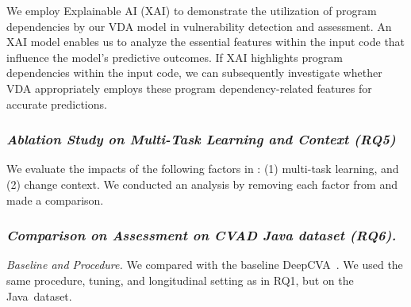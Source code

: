 We employ Explainable AI (XAI) to demonstrate the utilization of
program dependencies by our VDA model in vulnerability detection and
assessment. An XAI model enables us to analyze the essential features
within the input code that influence the model's predictive
outcomes. If XAI highlights program dependencies within the input
code, we can subsequently investigate whether VDA appropriately
employs these program dependency-related features for accurate
predictions.






\subsubsection{\bf \em Ablation Study on Multi-Task Learning and Context (RQ5)}

We evaluate the impacts of the following factors in {\tool}: (1)
multi-task learning, and (2) change context. We conducted an analysis
by removing each factor from {\tool} and made a comparison.



\subsubsection{\bf \em Comparison on Assessment on CVAD Java dataset (RQ6).\\}

{\em Baseline and Procedure.} We compared {\tool} with the baseline
DeepCVA~\cite{deepCVA-ase21}. We used the same procedure, tuning, and
longitudinal setting as in RQ1, but on the Java~dataset.








